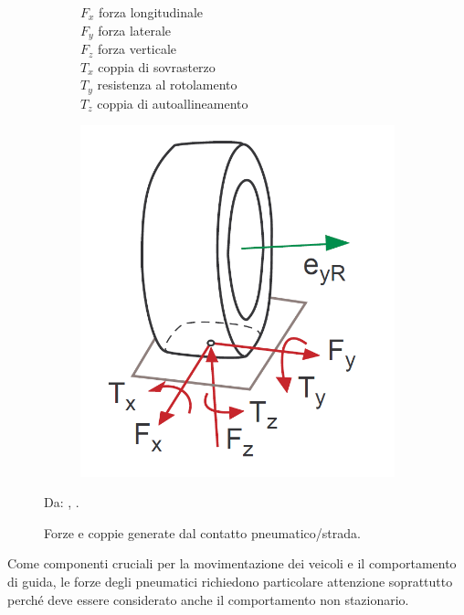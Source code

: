 \begin{figure}[h!]
	\centering
	\begin{subfigure}{0.4\linewidth}
		$F_x$ \quad forza longitudinale\\
		$F_y$ \quad forza laterale\\
		$F_z$ \quad forza verticale\\
		$T_x$ \quad coppia di sovrasterzo\\
		$T_y$ \quad resistenza al rotolamento\\
		$T_z$ \quad coppia di autoallineamento
	\end{subfigure}
	\begin{subfigure}{0.4\linewidth}
		\centering
		\includegraphics[width=\linewidth]{Figures/tire_forces}
	\end{subfigure}
\caption{Forze e coppie generate dal contatto pneumatico/strada.}
Da: \citeauthor{Rill}, .
\label{tireforces}
\end{figure}
%
Come componenti cruciali per la movimentazione dei veicoli e il comportamento di guida, le forze degli pneumatici richiedono particolare attenzione soprattutto perché deve essere considerato anche il comportamento non stazionario.


